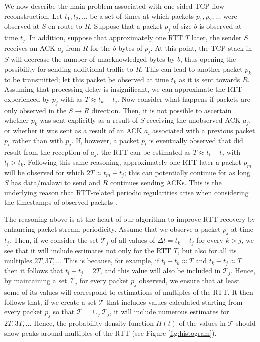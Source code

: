 %
%
We now describe the main problem associated with one-sided TCP flow reconstruction. Let $t_1, t_2, \ldots$ be a set of times at which packets $p_1, p_2, \ldots$ were observed at $S$ en route to $R$. Suppose that a packet $p_j$ of size $b$ is observed at time $t_j$. In addition, suppose that approximately one RTT $T$ later, the sender $S$ receives an ACK $a_j$ from $R$ for the $b$ bytes of $p_j$. At this point, the TCP stack in $S$ will decrease the number of unacknowledged bytes by $b$, thus opening the possibility for sending additional traffic to $R$. This can lead to another packet $p_k$ to be transmitted; let this packet be observed at time $t_k$ as it is sent towards $R$. Assuming that processing delay is insignificant, we can approximate the RTT experienced by $p_j$ with as $T \approx t_k - t_j$. Now consider what happens if packets are only observed in the $S \rightarrow R$ direction. Then, it is not possible to ascertain whether $p_k$ was sent explicitly as a result of $S$ receiving the unobserved 
ACK $a_j$, or whether it was sent as a result of an ACK $a_i$ associated with a previous packet $p_i$ rather than with $p_j$. If, however, a packet $p_l$ is eventually observed that did result from the 
reception of $a_j$, the RTT can be estimated as $T \approx t_l - t_j$ with $t_l > t_k$. Following this same reasoning, approximately one RTT later a packet $p_m$ will be observed for which $2T \approx t_m - t_j$; this can potentially continue for as long $S$ has data/malawi to send and $R$ continues sending ACKs. This is the underlying reason that RTT-related periodic regularities arise when considering the timestamps of observed packets \cite{Qian:2009p429}.

The reasoning above is at the heart of our algorithm to improve RTT recovery by enhancing packet stream periodicity. Assume that we observe a packet $p_j$ at time $t_j$. Then, if we consider the set $\mathcal{T}_j$ of all values of $\Delta t = t_k - t_j$ for every $k > j$, we see that it will include estimates not only for the RTT $T$, but also for all its multiples $2T, 3T, \ldots$ This is because, for example, if $t_l-t_k \approx T$ and $t_k - t_j \approx T$ then
it follows that $t_l - t_j = 2T$, and this value will also be included in $\mathcal{T}_j$. Hence, by maintaining a set $\mathcal{T}_j$ for every packet $p_j$ observed, we ensure that at least some of its values will correspond to estimations of multiples of the RTT. It then follows that, if we create a set $\mathcal{T}$ that includes values calculated starting from every packet $p_j$ so that $\mathcal{T} = \cup_j \mathcal{T}_j$, it will include numerous estimates for $2T, 3T, \ldots$ Hence, the probability density function $H(t)$ of the values in $\mathcal{T}$ should show peaks around multiples of the RTT (see Figure \ref{fig:histogram}). 

